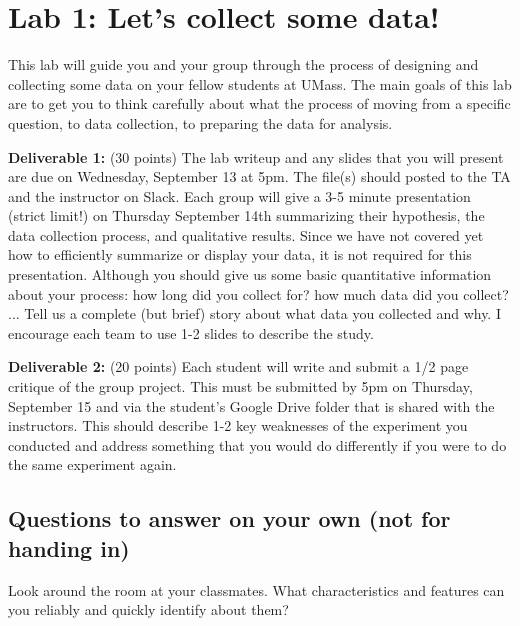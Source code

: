 \documentclass{article}\usepackage[]{graphicx}\usepackage[]{color}
\begin{document}

\section*{Lab 1: Let's collect some data!}

This lab will guide you and your group through the process of designing and collecting some data on your fellow students at UMass. The main goals of this lab are to get you to think carefully about what the process of moving from a specific question, to data collection, to preparing the data for analysis.

{\bf Deliverable 1:}
(30 points) The lab writeup and any slides that you will present are due on Wednesday, September 13 at 5pm. The file(s) should posted to the TA and the instructor on Slack. Each group will give a 3-5 minute presentation (strict limit!) on Thursday September 14th summarizing their hypothesis, the data collection process, and qualitative results. Since we have not covered yet how to efficiently summarize or display your data, it is not required for this presentation. Although you should give us some basic quantitative information about your process: how long did you collect for? how much data did you collect? ... Tell us a complete (but brief) story about what data you collected and why. I encourage each team to use 1-2 slides to describe the study.

{\bf Deliverable 2:} 
(20 points) Each student will write and submit a 1/2 page critique of the group project. This must be submitted by 5pm on Thursday, September 15 and via the student's Google Drive folder that is shared with the instructors. This should describe 1-2 key weaknesses of the experiment you conducted and address something that you would do differently if you were to do the same experiment again.

\subsection*{Questions to answer on your own (not for handing in)}

\begin{exercise}
Look around the room at your classmates. What characteristics and features can you reliably and quickly identify about them? 
\end{exercise}
\end{document}
